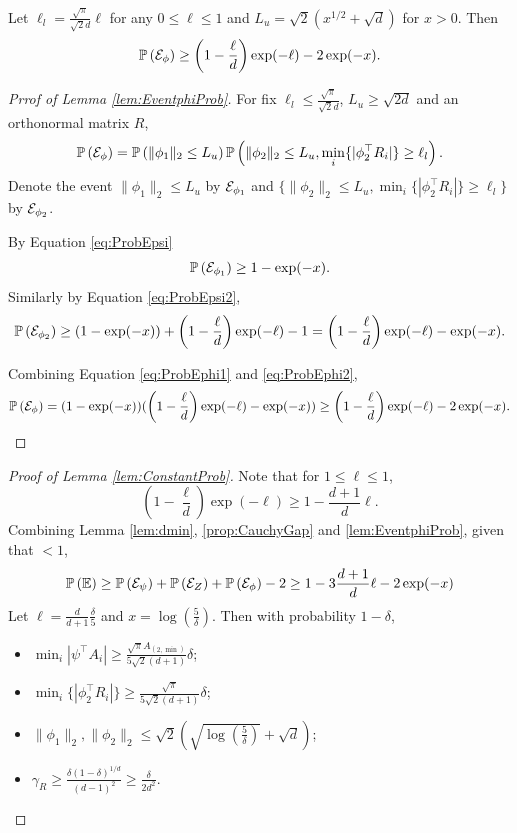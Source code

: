 \begin{lemma}
\label{lem:EventphiProb}
Let $\ell_l = \frac{\sqrt{\pi}}{\sqrt{2}d}\ell$ for any $0\le \ell\le 1$ and $ L_u = \sqrt{2}\left(x^{1/2}+\sqrt{d}\right)$ for $x>0$. Then
\[
\mathbb{P}\left(\mathcal{E}_{\phi}\right) \ge \left(1- \frac{\ell}{d}\right)\exp(-\ell) - 2\exp(-x).
\]
\end{lemma}
\begin{proof}[Prrof of Lemma \ref{lem:EventphiProb}]
For fix $\ell_l\le \frac{\sqrt{\pi}}{\sqrt{2}d}$, $L_u \ge \sqrt{2d}$ and an orthonormal matrix $R$, 
\[
\mathbb{P}\left(\mathcal{E}_{\phi}\right) = \mathbb{P}\left(\|\phi_1\|_2\le L_u\right)\mathbb{P}\left(\|\phi_2\|_2\le L_u, \min_i \{|\phi_2^{\top}R_i|\} \ge \ell_l\right).
\]
Denote the event $\|\phi_1\|_2\le L_u$ by $\mathcal{E}_{\phi_1}$ and $\{\|\phi_2\|_2\le L_u, \min_i \{|\phi_2^{\top}R_i|\} \ge \ell_l\}$ by $\mathcal{E}_{\phi_2}$. 

By Equation \eqref{eq:ProbEpsi}
\begin{equation}
\label{eq:ProbEphi1}
\mathbb{P}\left(\mathcal{E}_{\phi_1}\right) \ge 1-\exp(-x).
\end{equation}
Similarly by Equation \eqref{eq:ProbEpsi2},
\begin{equation}
\label{eq:ProbEphi2}
\mathbb{P}\left(\mathcal{E}_{\phi_2}\right) \ge (1-\exp(-x))+\left(1- \frac{\ell}{d}\right)\exp(-\ell)-1 = \left(1- \frac{\ell}{d}\right)\exp(-\ell)-\exp(-x).
\end{equation}

Combining Equation \eqref{eq:ProbEphi1} and \eqref{eq:ProbEphi2},
\[
\mathbb{P}\left(\mathcal{E}_{\phi}\right) = (1-\exp(-x))(\left(1- \frac{\ell}{d}\right)\exp(-\ell)-\exp(-x)) \ge \left(1- \frac{\ell}{d}\right)\exp(-\ell) - 2\exp(-x).
\]
\end{proof}

\begin{proof}[Proof of Lemma \ref{lem:ConstantProb}]
Note that for $1\le \ell \le 1$, 
\[
\left(1- \frac{\ell}{d}\right)\exp(-\ell) \ge 1-\frac{d+1}{d}\ell.
\]
Combining Lemma \ref{lem:dmin}, \ref{prop:CauchyGap} and \ref{lem:EventphiProb}, given that $<1$,
\[
\mathbb{P}\left(\mathbb{E}\right) \ge \mathbb{P}\left(\mathcal{E}_{\psi}\right) + \mathbb{P}\left(\mathcal{E}_{Z}\right) + \mathbb{P}\left(\mathcal{E}_{\phi}\right) -2 \ge 1- 3\frac{d+1}{d}\ell- 2\exp(-x)  
\]
Let $\ell = \frac{d}{d+1}\frac{\delta}{5}$ and $ x= \log(\frac{5}{\delta})$.
Then with probability $1-\delta$, 
\begin{itemize}
\item $\min_i |\psi^{\top}A_i| \ge \frac{\sqrt{\pi}A_{(2,\min)}}{5\sqrt{2}(d+1)} \delta$;
\item $\min_i \{|\phi_2^{\top}R_i|\} \ge \frac{\sqrt{\pi}}{5\sqrt{2}(d+1)}\delta$;
\item $\|\phi_1\|_2, \|\phi_2\|_2 \le \sqrt{2}\left(\sqrt{\log(\frac{5}{\delta})}+\sqrt{d}\right)$;
\item $\gamma_R \ge \frac{\delta(1-\delta)^{1/d}}{(d-1)^2} \ge \frac{\delta}{2d^2}$.
\end{itemize}
\end{proof}

